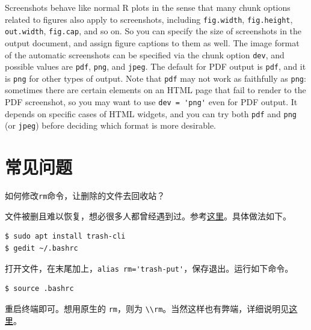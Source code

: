 \documentclass[doctor,openright,twoside]{sjtuthesis}
\newcommand\setholdfigure{\floatplacement{figure}{H}}
\newcommand{\passthrough}[1]{#1}
\theoremstyle{plain}
\theoremstyle{definition}
\theoremstyle{remark}
\theoremstyle{ocrenumbox}
\theoremstyle{plain}
\let\BeginKnitrBlock\begin \let\EndKnitrBlock\end
\begin{document}
Screenshots behave like normal R plots in the sense that many chunk options related to figures also apply to screenshots, including \passthrough{\lstinline!fig.width!}, \passthrough{\lstinline!fig.height!}, \passthrough{\lstinline!out.width!}, \passthrough{\lstinline!fig.cap!}, and so on. So you can specify the size of screenshots in the output document, and assign figure captions to them as well. The image format of the automatic screenshots can be specified via the chunk option \passthrough{\lstinline!dev!}, and possible values are \passthrough{\lstinline!pdf!}, \passthrough{\lstinline!png!}, and \passthrough{\lstinline!jpeg!}. The default for PDF output is \passthrough{\lstinline!pdf!}, and it is \passthrough{\lstinline!png!} for other types of output. Note that \passthrough{\lstinline!pdf!} may not work as faithfully as \passthrough{\lstinline!png!}: sometimes there are certain elements on an HTML page that fail to render to the PDF screenshot, so you may want to use \passthrough{\lstinline!dev = 'png'!} even for PDF output. It depends on specific cases of HTML widgets, and you can try both \passthrough{\lstinline!pdf!} and \passthrough{\lstinline!png!} (or \passthrough{\lstinline!jpeg!}) before deciding which format is more desirable.

\hypertarget{chap:faqs}{%
\chapter{常见问题}\label{chap:faqs}}

\setholdfigure

\BeginKnitrBlock{question}
如何修改\passthrough{\lstinline!rm!}命令，让删除的文件去回收站？
\EndKnitrBlock{question}

\BeginKnitrBlock{answer}
文件被删且难以恢复，想必很多人都曾经遇到过。参考\href{https://bbs.deepin.org/forum.php?mod=redirect\&goto=findpost\&ptid=159778\&pid=487081\&fromuid=16639}{这里}。具体做法如下。

\begin{lstlisting}[language=bash, numbers=none]
$ sudo apt install trash-cli
$ gedit ~/.bashrc
\end{lstlisting}

打开文件，在末尾加上，\passthrough{\lstinline!alias rm='trash-put'!}，保存退出。运行如下命令。

\begin{lstlisting}[language=bash, numbers=none]
$ source .bashrc
\end{lstlisting}

重启终端即可。想用原生的 \passthrough{\lstinline!rm!}，则为 \passthrough{\lstinline!\\rm!}。当然这样也有弊端，详细说明见\href{https://bbs.deepin.org/forum.php?mod=redirect\&goto=findpost\&ptid=159778\&pid=487121\&fromuid=16639}{这里}。
\EndKnitrBlock{answer}
\end{document}
